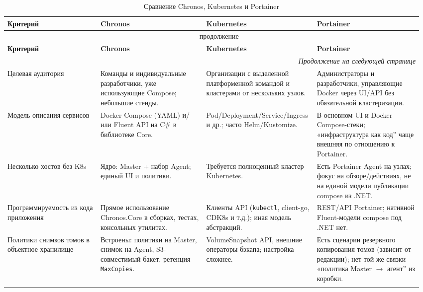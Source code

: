 {\small
\begin{longtable}{@{}p{0.22\linewidth}p{0.25\linewidth}p{0.25\linewidth}p{0.25\linewidth}@{}}
\caption{Сравнение Chronos, Kubernetes и Portainer} \label{tab:compare-chronos-k8s-portainer} \\
\toprule
\textbf{Критерий} & \textbf{Chronos} & \textbf{Kubernetes} & \textbf{Portainer} \\
\midrule
\endfirsthead
\multicolumn{4}{c}{\tablename\ \thetable{} --- продолжение} \\
\toprule
\textbf{Критерий} & \textbf{Chronos} & \textbf{Kubernetes} & \textbf{Portainer} \\
\midrule
\endhead
\midrule
\multicolumn{4}{r}{\small\textit{Продолжение на следующей странице}} \\
\endfoot
\endlastfoot

Целевая аудитория &
Команды и индивидуальные разработчики, уже использующие Compose; небольшие стенды. &
Организации с выделенной платформенной командой и кластерами от нескольких узлов. &
Администраторы и разработчики, управляющие Docker через UI/API без обязательной кластеризации. \\
\addlinespace

Модель описания сервисов &
Docker Compose (YAML) и/или Fluent API на C\# в библиотеке Core. &
Pod/Deployment/\newline Service/Ingress и др.; часто Helm/Kustomize. &
В основном UI и Docker Compose-стеки; «инфраструктура как код'' чаще внешняя по отношению к Portainer. \\
\addlinespace

Несколько хостов без K8s &
Ядро: Master + набор Agent; единый UI и политики. &
Требуется полноценный кластер Kubernetes. &
Есть Portainer Agent на узлах; фокус на обзоре/действиях, не на единой модели публикации compose из .NET. \\
\addlinespace

Программируемость из кода приложения &
Прямое использование Chronos.Core в сборках, тестах, консольных утилитах. &
Клиенты API (\texttt{kubectl}, client-go, CDK8s и т.д.); иная модель абстракций. &
REST/API Portainer; нативной Fluent-модели compose под .NET нет. \\
\addlinespace

Политики снимков томов в объектное хранилище &
Встроены: политики на Master, снимок на Agent, S3-совместимый бакет, ретенция \texttt{MaxCopies}. &
VolumeSnapshot API, внешние операторы бэкапа; настройка сложнее. &
Есть сценарии резервного копирования томов (зависит от редакции); нет той же связки «политика Master $\rightarrow$ агент'' из коробки. \\
\addlinespace


\end{longtable}}
